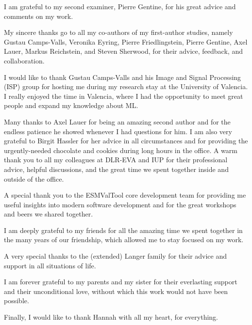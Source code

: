 I am grateful to my second examiner, \Prof{} \Dr{} Pierre Gentine, for his
great advice and comments on my work.

My sincere thanks go to all my co-authors of my first-author studies, namely
\Prof{} \Dr{} Gustau Camps-Valls, \Prof{} \Dr{} Veronika Eyring, \Prof{} \Dr{}
Pierre Friedlingstein, \Prof{} \Dr{} Pierre Gentine, \Dr{} Axel Lauer, \Prof{}
\Dr{} Markus Reichstein, and \Prof{} \Dr{} Steven Sherwood, for their advice,
feedback, and collaboration.

I would like to thank \Prof{} \Dr{} Gustau Camps-Valls and his Image and Signal
Processing (ISP) group for hosting me during my research stay at the University
of Valencia. I really enjoyed the time in Valencia, where I had the opportunity
to meet great people and expand my knowledge about \acl{ML}.

Many thanks to \Dr{} Axel Lauer for being an amazing second author and for the
endless patience he showed whenever I had questions for him. I am also very
grateful to \Dr{} Birgit Hassler for her advice in all circumstances and for
providing the urgently-needed chocolate and cookies during long hours in the
office. A warm thank you to all my colleagues at DLR-EVA and IUP for their
professional advice, helpful discussions, and the great time we spent together
inside and outside of the office.

A special thank you to the \ac{ESMValTool} core development team for providing
me useful insights into modern software development and for the great workshops
and beers we shared together.

I am deeply grateful to my friends for all the amazing time we spent together
in the many years of our friendship, which allowed me to stay focused on my
work.

A very special thanks to the (extended) Langer family for their advice and
support in all situations of life.

I am forever grateful to my parents and my sister for their everlasting support
and their unconditional love, without which this work would not have been
possible.

Finally, I would like to thank Hannah with all my heart, for everything.

